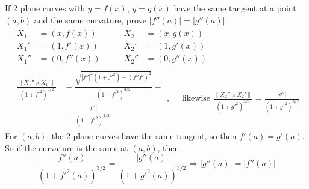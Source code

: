 \documentclass[twoside]{amsart}
\theoremstyle{plain}
\theoremstyle{definition}
\newcommand{\exercisehead}[1]
  {\smallskip
   \noindent{\small\bf Exercise #1.}}
\begin{document}
\exercisehead{8} If 2 plane curves with $y=f(x)$, $y=g(x)$ have the same tangent at a point $(a,b)$ and the same curvature, prove $|f''(a)| = |g''(a)|$.  
\[
\begin{gathered}
  \begin{aligned}
    X_1 & = (x,f(x)) \\
    X_1' & = (1,f'(x)) \\
    X_1'' & = (0,f''(x))
  \end{aligned} \quad \quad 
  \begin{aligned}
    X_2 & = (x,g(x)) \\
    X_2' & = (1,g'(x)) \\
    X_2'' & = (0,g''(x))
  \end{aligned} \\
  \begin{aligned}
    \frac{ \| X_1'' \times X_1' \| }{ (1+f'^2)^{3/2} } & = \frac{ \sqrt{ |f''|^2 (1+f'^2) - (f'' f')^2} }{ (1+f'^2)^{3/2} } = \\
    & = \frac{ |f''|}{ (1+f'^2)^{3/2} } 
  \end{aligned}, \quad \text{ likewise } \frac{ \| X_2'' \times X_2' \| }{ (1+g'^2)^{3/2} } = \frac{ |g''| }{ (1+g'^2)^{3/2} } 
\end{gathered}
\]
For $(a,b)$, the 2 plane curves have the same tangent, so then $f'(a) = g'(a)$.  So if the curvature is the same at $(a,b)$, then
\[
\frac{ |f''(a)| }{ (1+f'^2(a))^{3/2}} = \frac{ |g''(a)|}{ (1+g'^2(a))^{3/2} } \Longrightarrow \boxed{ |g''(a)| = |f''(a)| }
\]
\end{document}
